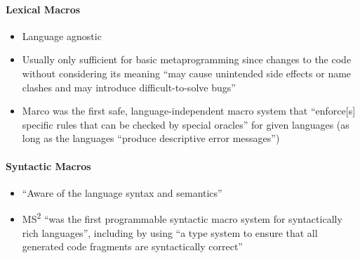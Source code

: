\paragraph{Lexical Macros}
\begin{itemize}
      \item Language agnostic \cite[p.~113:3]{lilis_survey_2019}
      \item Usually only sufficient for basic metaprogramming since changes to
            the code without considering its meaning ``may cause unintended side
            effects or name clashes and may introduce difficult-to-solve bugs''
            \cite[p.~113:5]{lilis_survey_2019}
      \item Marco was the first safe, language-independent macro system that
            ``enforce[s] specific rules that can be checked by special oracles''
            for given languages (as long as the languages ``produce descriptive
            error messages'') \cite[p.~113:6]{lilis_survey_2019}
\end{itemize}

\paragraph{Syntactic Macros}
\begin{itemize}
      \item ``Aware of the language syntax and semantics''
            \cite[p.~113:3]{lilis_survey_2019}
      \item MS\textsuperscript{2} ``was the first programmable syntactic macro
            system for syntactically rich languages'', including by using ``a
            type system to ensure that all generated code fragments are
            syntactically correct'' \cite[p.~113:5]{lilis_survey_2019}
\end{itemize}

